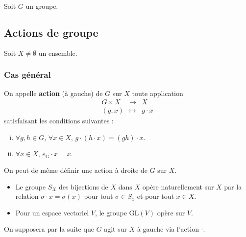




	Soit $G$ un groupe.

	\subsection{Actions de groupe}

	Soit $X \neq \emptyset$ un ensemble.

	\subsubsection{Cas général}


	\begin{definition}
		On appelle \textbf{action} (à gauche) de $G$ sur $X$ toute application
		\[
		\begin{array}{ccc}
			G \times X &\rightarrow& X \\
			(g, x) &\mapsto& g \cdot x
		\end{array}
		\]
		satisfaisant les conditions suivantes :
		\begin{enumerate}[(i)]
			\item $\forall g, h \in G$, $\forall x \in X$, $g \cdot (h \cdot x) = (gh) \cdot x$.
			\item $\forall x \in X$, $e_G \cdot x = x$.
		\end{enumerate}
	\end{definition}

	\begin{remark}
		On peut de même définir une action à droite de $G$ sur $X$.
	\end{remark}

	\begin{example}
		\begin{itemize}
			\item Le groupe $S_X$ des bijections de $X$ dans $X$ opère naturellement sur $X$ par la relation $\sigma \cdot x = \sigma(x)$ pour tout $\sigma \in S_x$ et pour tout $x \in X$.
			\item Pour un espace vectoriel $V$, le groupe $\mathrm{GL}(V)$ opère sur $V$.
		\end{itemize}
	\end{example}

	On supposera par la suite que $G$ agit sur $X$ à gauche via l'action $\cdot$.

